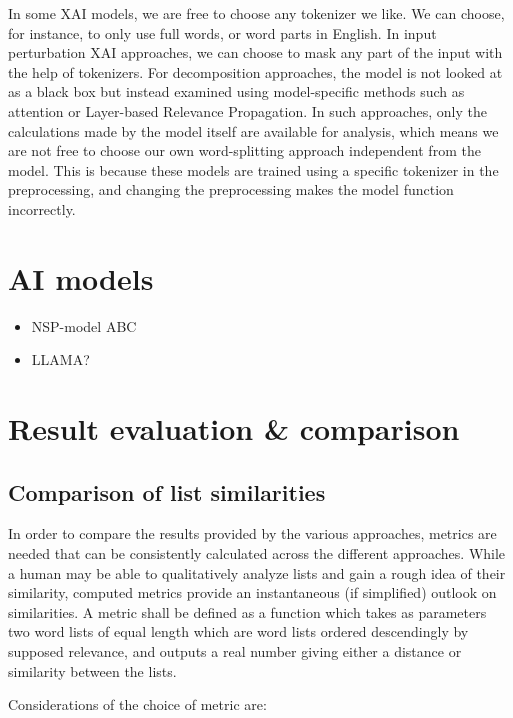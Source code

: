 In some XAI models, we are free to choose any tokenizer we like.
We can choose, for instance, to only use full words, or word parts in English.
In input perturbation XAI approaches, we can choose to mask any part of the input with the help of tokenizers.
For decomposition approaches, the model is not looked at as a black box but instead examined using model-specific methods such as attention or Layer-based Relevance Propagation.
In such approaches, only the calculations made by the model itself are available for analysis, which means we are not free to choose our own word-splitting approach independent from the model.
This is because these models are trained using a specific tokenizer in the preprocessing, and changing the preprocessing makes the model function incorrectly.


\section{AI models}
\begin{itemize}
	\item NSP-model ABC
	\item LLAMA?
\end{itemize}


\section{Result evaluation \& comparison}

\subsection{Comparison of list similarities}
In order to compare the results provided by the various approaches, metrics are needed that can be consistently calculated across the different approaches.
While a human may be able to qualitatively analyze lists and gain a rough idea of their similarity, computed metrics provide an instantaneous (if simplified) outlook on similarities.
A metric shall be defined as a function which takes as parameters two word lists of equal length which are word lists ordered descendingly by supposed relevance, and outputs a real number giving either a distance or similarity between the lists.

Considerations of the choice of metric are:

